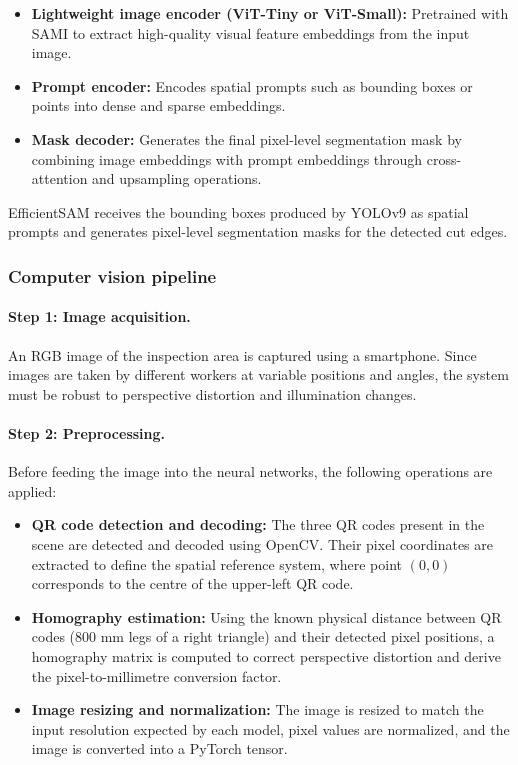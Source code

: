 \documentclass[11pt]{article}
\begin{document}
\begin{itemize}
    \item \textbf{Lightweight image encoder (ViT-Tiny or ViT-Small):} Pretrained with 
    SAMI to extract high-quality visual feature embeddings from the input image.
    \item \textbf{Prompt encoder:} Encodes spatial prompts such as bounding boxes or 
    points into dense and sparse embeddings.
    \item \textbf{Mask decoder:} Generates the final pixel-level segmentation mask by 
    combining image embeddings with prompt embeddings through cross-attention and 
    upsampling operations.
\end{itemize}

EfficientSAM receives the bounding boxes produced by YOLOv9 as spatial prompts and 
generates pixel-level segmentation masks for the detected cut edges.

\subsubsection{Computer vision pipeline}

\paragraph{Step 1: Image acquisition.}
An RGB image of the inspection area is captured using a smartphone. Since images are 
taken by different workers at variable positions and angles, the system must be robust 
to perspective distortion and illumination changes.

\paragraph{Step 2: Preprocessing.}
Before feeding the image into the neural networks, the following operations are applied:
\begin{itemize}
    \item \textbf{QR code detection and decoding:} The three QR codes present in the 
    scene are detected and decoded using OpenCV. Their pixel coordinates are extracted 
    to define the spatial reference system, where point $(0, 0)$ corresponds to the 
    centre of the upper-left QR code.
    \item \textbf{Homography estimation:} Using the known physical distance between 
    QR codes (800 mm legs of a right triangle) and their detected pixel positions, a 
    homography matrix is computed to correct perspective distortion and derive the 
    pixel-to-millimetre conversion factor.
    \item \textbf{Image resizing and normalization:} The image is resized to match the 
    input resolution expected by each model, pixel values are normalized, and the image 
    is converted into a PyTorch tensor.
\end{itemize}
\end{document}

